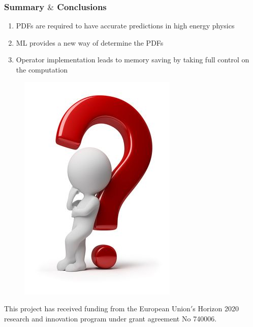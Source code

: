 \documentclass[aspectratio=43]{beamer}
\begin{document}
\begin{frame}
	
	\frametitle{Summary $\&$ Conclusions}

	\begin{enumerate}
		\item PDFs are required to have accurate predictions in high energy physics
		\item ML provides a new way of determine the PDFs
		\item Operator implementation leads to memory saving by taking full control on the computation
	\end{enumerate}

\end{frame}

\begin{frame}


	\begin{figure}
		\includegraphics[width = 3 cm]{thinking2.png}
	\end{figure}
	
	{\small \color{blue} This project has received funding from the European Union$'$s Horizon 2020 research and innovation program under grant agreement No 740006.}

\end{frame}
\end{document}
